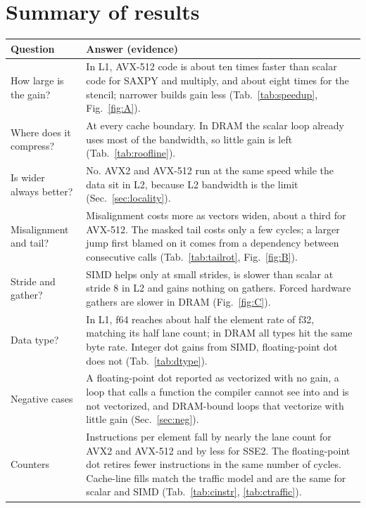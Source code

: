 \documentclass{article}
\begin{document}
\appendix
\section{Summary of results}\label{sec:summary}
{\small
\begin{tabular}{p{4.0cm}p{12.1cm}}
\toprule
\textbf{Question} & \textbf{Answer (evidence)} \\
\midrule
How large is the gain? & In L1, AVX-512 code is about ten times faster than scalar code for SAXPY and multiply, and about eight times for the stencil; narrower builds gain less (Tab.~\ref{tab:speedup}, Fig.~\ref{fig:A}). \\
Where does it compress? & At every cache boundary. In DRAM the scalar loop already uses most of the bandwidth, so little gain is left (Tab.~\ref{tab:roofline}). \\
Is wider always better? & No. AVX2 and AVX-512 run at the same speed while the data sit in L2, because L2 bandwidth is the limit (Sec.~\ref{sec:locality}). \\
Misalignment and tail? & Misalignment costs more as vectors widen, about a third for AVX-512. The masked tail costs only a few cycles; a larger jump first blamed on it comes from a dependency between consecutive calls (Tab.~\ref{tab:tailrot}, Fig.~\ref{fig:B}). \\
Stride and gather? & SIMD helps only at small strides, is slower than scalar at stride 8 in L2 and gains nothing on gathers. Forced hardware gathers are slower in DRAM (Fig.~\ref{fig:C}). \\
Data type? & In L1, f64 reaches about half the element rate of f32, matching its half lane count; in DRAM all types hit the same byte rate. Integer dot gains from SIMD, floating-point dot does not (Tab.~\ref{tab:dtype}). \\
Negative cases & A floating-point dot reported as vectorized with no gain, a loop that calls a function the compiler cannot see into and is not vectorized, and DRAM-bound loops that vectorize with little gain (Sec.~\ref{sec:neg}). \\
Counters & Instructions per element fall by nearly the lane count for AVX2 and AVX-512 and by less for SSE2. The floating-point dot retires fewer instructions in the same number of cycles. Cache-line fills match the traffic model and are the same for scalar and SIMD (Tab.~\ref{tab:cinstr}, \ref{tab:ctraffic}). \\
\bottomrule
\end{tabular}
}
\end{document}

